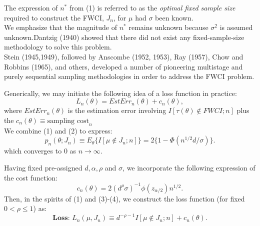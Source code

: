 \documentclass [xcolor=svgnames, t] {beamer}
\begin{document}
 \begin{frame}{}
  \vspace{7mm}

The expression of $n^*$ from (1) is referred to as the \textit{optimal fixed sample size} required to construct the FWCI, $J_n$, for $\mu$ had $\sigma$ been known. \\
\vspace{0.2cm}
We emphasize that the magnitude of $n^*$ remains unknown because $\sigma^2$ is assumed unknown.Dantzig (1940) showed that there 
did not exist any fixed-sample-size methodology to solve this problem.\\
\vspace{0.2cm}
Stein (1945,1949), followed by Anscombe (1952, 1953), Ray (1957), Chow and Robbins (1965), and
others, developed a number of pioneering multistage and purely sequential sampling
methodologies in order to address the FWCI problem.

\end{frame}
\begin{frame}{}
    \vspace{7mm}
    Generically, we may initiate the following idea of a loss function in practice:
        \begin{equation} \label{loss_fn}
            L_n(\theta)  = EstErr_n(\theta)+c_n(\theta),
        \end{equation}
        where $EstErr_n(\theta)$ is the estimation error involving $I \left[ {\tau(\theta) \not\in FWCI;n} \right]$ plus the $c_n(\theta) \equiv \text{sampling cost}_n$\\
        \vspace{2mm}
    We combine (1) and (2) to express:
        \begin{equation}
        p_n(\theta ;J_n) \equiv E_{\theta} \{ {I[ \mu \not\in J_n;n]}\} =2\{ 1-\Phi(n^{1/2}d/\sigma) \}.
        \end{equation}
        which converges to $0$ as $n \rightarrow \infty$.\\
        \vspace{0.1cm}
                
\end{frame}
\begin{frame}{}
\vspace{10mm}
Having fixed pre-assigned $d,\alpha,\rho$ and $\sigma$, we incorporate the following expression of the cost function:
        \begin{equation} \label{cost_fn}
        c_n(\theta) = 2(d^\rho \sigma)^{-1} \phi(z_{\alpha/2})n^{1/2}.
        \end{equation}
Then, in the spirits of (1) and (3)-(4), we construct the loss function (for fixed $0<\rho \le 1$) as:
        \begin{equation}
            \textbf{Loss: }L_n(\mu,J_n) \equiv d^{-\rho-1}I[\mu \not\in J_n;n]+c_n(\theta).
        \end{equation}

\end{frame}
\end{document}
